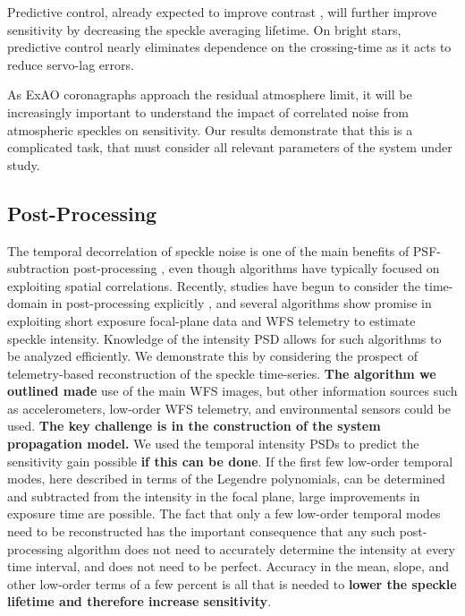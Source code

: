 \documentclass[10pt,preprint]{aastex631}
\begin{document}
Predictive control, already expected to improve contrast \citep{2007JOSAA..24.2645P,2017JOSAA..34.1877C,2018JATIS...4a9001M, 2021arXiv210307566H}, will further improve sensitivity by decreasing the speckle averaging lifetime.  On bright stars, predictive control nearly eliminates dependence on the crossing-time as it acts to reduce servo-lag errors.

As ExAO coronagraphs approach the residual atmosphere limit, it will be increasingly important to understand the impact of correlated noise from atmospheric speckles on sensitivity.  Our results demonstrate that this is a complicated task, that must consider all relevant parameters of the system under study.

\subsection{Post-Processing}
The temporal decorrelation of speckle noise is one of the main benefits of PSF-subtraction post-processing \citep{2006ApJ...641..556M,2008ApJ...673..647M}, even though algorithms have typically focused on exploiting spatial correlations.  Recently, studies have begun to consider the time-domain in post-processing explicitly \citep{2021A&A...646A..24S}, and several algorithms show promise in exploiting short exposure focal-plane data \citep{2019PASP..131k4506W, 2021arXiv210306898S} and WFS telemetry \textbf{\citep[][submitted]{2021arXiv210506589R}\citep[][submitted]{2021arXiv210506590F}} to estimate speckle intensity.   Knowledge of the intensity PSD allows for such algorithms to be analyzed efficiently.  We demonstrate this by considering the prospect of telemetry-based reconstruction of the speckle time-series. \textbf{The algorithm we outlined made} use of the main WFS images, but other information sources such as accelerometers, low-order WFS telemetry, and environmental sensors could be used.  \textbf{The key challenge is in the construction of the system propagation model.}  We used the temporal intensity PSDs to predict the sensitivity gain possible \textbf{if this can be done}.  If the first few low-order temporal modes, here described in terms of the Legendre polynomials, can be determined and subtracted from the intensity in the focal plane, large improvements in exposure time are possible.  The fact that only a few low-order temporal modes need to be reconstructed has the important consequence that any such post-processing algorithm does not need to accurately determine the intensity at every time interval, and does not need to be perfect.  Accuracy in the mean, slope, and other low-order terms of a few percent is all that is needed to \textbf{lower the speckle lifetime and therefore increase sensitivity}. 
\end{document}
